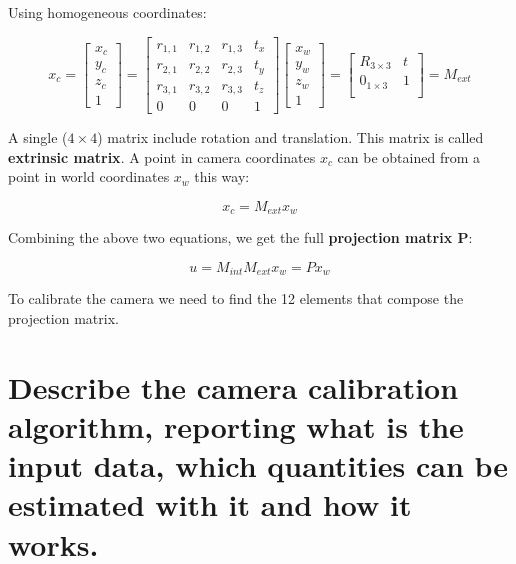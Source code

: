 \documentclass{article}
\begin{document}
Using homogeneous coordinates:

\begin{equation*}
    x_c = 
    \begin{bmatrix}
        x_c \\
        y_c \\
        z_c \\
        1
    \end{bmatrix}
    =
    \begin{bmatrix}
        r_{1,1} & r_{1,2} & r_{1,3} & t_x \\
        r_{2,1} & r_{2,2} & r_{2,3} & t_y \\
        r_{3,1} & r_{3,2} & r_{3,3} & t_z \\
        0 & 0 & 0 & 1
    \end{bmatrix}
    \begin{bmatrix}
        x_w \\
        y_w \\
        z_w \\
        1
    \end{bmatrix}
    = 
    \begin{bmatrix}
        R_{3\times3} & t \\
        0_{1\times3} & 1 \\
    \end{bmatrix}
    = M_{ext}
\end{equation*}

A single ($4\times4$) matrix include rotation and translation. This matrix is called \textbf{extrinsic matrix}. A point in camera coordinates $x_c$ can be obtained from a point in world coordinates $x_w$ this way:

\begin{equation*}
    x_c = M_{ext} x_w
\end{equation*}

Combining the above two equations, we get the full \textbf{projection matrix P}:

\begin{equation*}
    u = M_{int} M_{ext} x_w = P x_w
\end{equation*}

To calibrate the camera we need to find the 12 elements that compose the projection matrix.

\newpage

\section{Describe the camera calibration algorithm, reporting what is the input data, which quantities can be estimated with it and how it works.}
\end{document}
